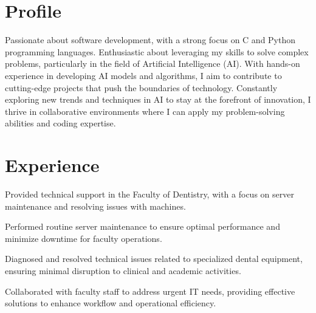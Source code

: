 \documentclass[]{deedy-resume-reversed}
\begin{document}
%
%

%
%

%
%

\begin{minipage}[t]{0.60\textwidth}

\section{Profile}
Passionate about software development, with a strong focus on C and Python programming languages. Enthusiastic about leveraging my skills to solve complex problems, particularly in the field of Artificial Intelligence (AI). 
With hands-on experience in developing AI models and algorithms, I aim to contribute to cutting-edge projects that push the boundaries of technology. Constantly exploring new trends and techniques in AI to stay at the forefront of innovation, I thrive in collaborative environments where I can apply my problem-solving abilities and coding expertise.
\sectionsep

\section{Experience}
\vspace{1em}
\begin{tightemize}
\item Provided technical support in the Faculty of Dentistry, with a focus on server maintenance and resolving issues with machines.
\item Performed routine server maintenance to ensure optimal performance and minimize downtime for faculty operations.
\item Diagnosed and resolved technical issues related to specialized dental equipment, ensuring minimal disruption to clinical and academic activities.
\item Collaborated with faculty staff to address urgent IT needs, providing effective solutions to enhance workflow and operational efficiency.
\end{tightemize}
\sectionsep



\end{minipage}
\end{document}
